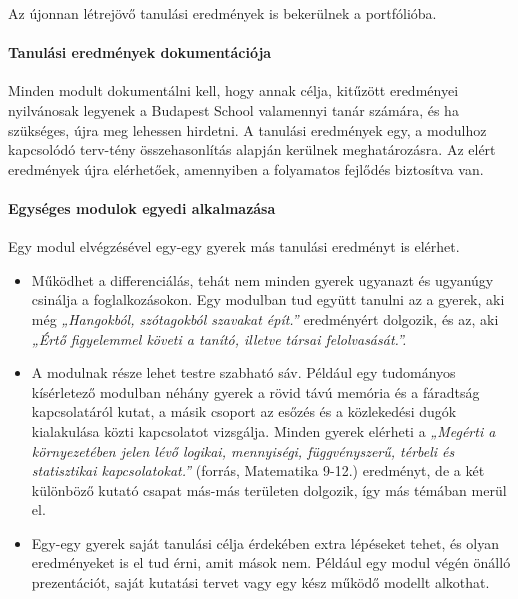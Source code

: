 Az újonnan létrejövő tanulási eredmények is bekerülnek a portfólióba.

\hypertarget{tanulasi-eredmenyek-dokumentacioja}{%
\paragraph{Tanulási eredmények
dokumentációja}\label{tanulasi-eredmenyek-dokumentacioja}}

Minden modult dokumentálni kell, hogy annak célja, kitűzött eredményei
nyilvánosak legyenek a Budapest School valamennyi tanár számára, és ha
szükséges, újra meg lehessen hirdetni. A tanulási eredmények egy, a
modulhoz kapcsolódó terv-tény összehasonlítás alapján kerülnek
meghatározásra. Az elért eredmények újra elérhetőek, amennyiben a
folyamatos fejlődés biztosítva van.

\hypertarget{egyseges-modulok-egyedi-alkalmazasa}{%
\paragraph{Egységes modulok egyedi
alkalmazása}\label{egyseges-modulok-egyedi-alkalmazasa}}

Egy modul elvégzésével egy-egy gyerek más tanulási eredményt is elérhet.

\begin{itemize}
\item
  Működhet a differenciálás, tehát nem minden gyerek ugyanazt és
  ugyanúgy csinálja a foglalkozásokon. Egy modulban tud együtt tanulni
  az a gyerek, aki még \emph{„Hangokból, szótagokból szavakat épít.''}
  eredményért dolgozik, és az, aki \emph{„Értő figyelemmel követi a
  tanító, illetve társai felolvasását.''.}
\item
  A modulnak része lehet testre szabható sáv. Például egy tudományos
  kísérletező modulban néhány gyerek a rövid távú memória és a fáradtság
  kapcsolatáról kutat, a másik csoport az esőzés és a közlekedési dugók
  kialakulása közti kapcsolatot vizsgálja. Minden gyerek elérheti a
  \emph{„Megérti a környezetében jelen lévő logikai, mennyiségi,
  függvényszerű, térbeli és statisztikai kapcsolatokat.''} (forrás,
  Matematika 9-12.) eredményt, de a két különböző kutató csapat más-más
  területen dolgozik, így más témában merül el.
\item
  Egy-egy gyerek saját tanulási célja érdekében extra lépéseket tehet,
  és olyan eredményeket is el tud érni, amit mások nem. Például egy
  modul végén önálló prezentációt, saját kutatási tervet vagy egy kész
  működő modellt alkothat.
\end{itemize}

